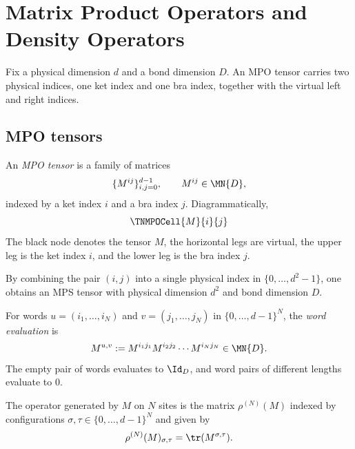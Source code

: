 \chapter{Matrix Product Operators and Density Operators}\label{ch:mpdo}

Fix a physical dimension $d$ and a bond dimension $D$.
An MPO tensor carries two physical indices, one ket index and one bra index,
together with the virtual left and right indices.

\section{MPO tensors}

\begin{definition}\label{def:mpo_tensor}
    \leanok
    An \emph{MPO tensor} is a family of matrices
    \[
        \{M^{ij}\}_{i,j=0}^{d-1}, \qquad M^{ij} \in \MN{D},
    \]
    indexed by a ket index $i$ and a bra index $j$. Diagrammatically,
    \[
        \TNMPOCell{M}{i}{j}
    \]
    The black node denotes the tensor $M$, the horizontal legs are virtual,
    the upper leg is the ket index $i$, and the lower leg is the bra
    index $j$.
\end{definition}

\begin{definition}\label{def:mpo_to_mps}
    \leanok
    By combining the pair $(i,j)$ into a single physical index in
    $\{0,\ldots,d^2-1\}$, one obtains an MPS tensor with physical dimension
    $d^2$ and bond dimension $D$.
\end{definition}

\begin{definition}\label{def:mpo_eval_word}
    \leanok
    For words
    $u = (i_1,\ldots,i_N)$ and $v = (j_1,\ldots,j_N)$ in $\{0,\ldots,d{-}1\}^N$,
    the \emph{word evaluation} is
    \[
        M^{u,v} := M^{i_1 j_1} M^{i_2 j_2} \cdots M^{i_N j_N} \in \MN{D}.
    \]
    The empty pair of words evaluates to $\Id_D$, and word pairs of different
    lengths evaluate to $0$.
\end{definition}

\begin{definition}\label{def:mpo_family}
    \leanok
    The operator generated by $M$ on $N$ sites is the matrix
    $\rho^{(N)}(M)$ indexed by configurations
    $\sigma,\tau \in \{0,\ldots,d{-}1\}^N$ and given by
    \[
        \rho^{(N)}(M)_{\sigma,\tau} = \tr(M^{\sigma,\tau}).
    \]
\end{definition}

